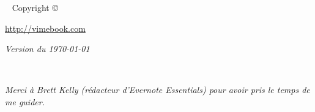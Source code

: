 
\setcounter{tocdepth}{1}



\frontmatter

\maketitle

\newpage
\begin{fullwidth}
~\vfill
\thispagestyle{empty}
\setlength{\parindent}{0pt}
\setlength{\parskip}{\baselineskip}
Copyright \copyright\ \the\year\ \thanklessauthor

\par{}

\par{}

\par \url{http://vimebook.com}
\par\textit{Version du  \today}

\end{fullwidth}

\tableofcontents


\cleardoublepage
~\vfill
\begin{doublespace}
\noindent\fontsize{18}{22}\selectfont\itshape
\nohyphenation
Merci à Brett Kelly (rédacteur d'Evernote Essentials) pour avoir pris le temps de me guider.
\end{doublespace}
\vfill
\vfill

\cleardoublepage



\mainmatter









\listoffigures

\printindex



